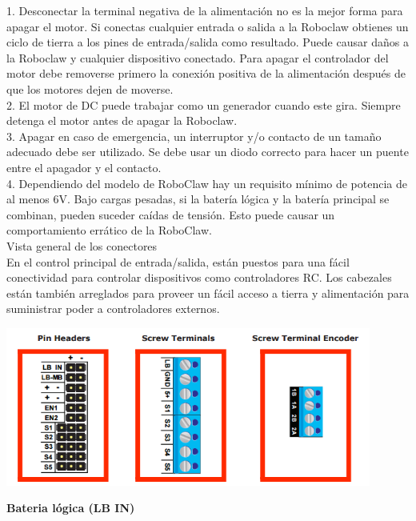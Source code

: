 \documentclass[user_manual.tex]{subfiles}
\begin{document}
1. Desconectar la terminal negativa de la alimentación no es la mejor forma para apagar el motor. Si conectas cualquier entrada o salida
a la Roboclaw obtienes un ciclo de tierra a los pines de entrada/salida como resultado. Puede causar daños a la Roboclaw y cualquier
dispositivo conectado. Para apagar el controlador del motor debe removerse primero la conexión positiva de la alimentación después de
que los motores dejen de moverse.\\

2. El motor de DC puede trabajar como un generador cuando este gira. Siempre detenga el motor
antes de apagar la Roboclaw.\\

3. Apagar en caso de emergencia, un interruptor y/o contacto de un tamaño adecuado debe ser utilizado. Se debe usar un diodo correcto para
hacer un puente entre el apagador y el contacto.\\

4. Dependiendo del modelo de RoboClaw hay un requisito mínimo de potencia de al menos 6V. Bajo cargas pesadas, si la batería lógica y
la batería principal se combinan, pueden suceder caídas de tensión. Esto puede causar un comportamiento errático de la RoboClaw.\\
Vista general de los conectores\\

En el control principal de entrada/salida, están puestos para una fácil conectividad para controlar dispositivos como controladores RC.
Los cabezales están también arreglados para proveer un fácil acceso a tierra  y alimentación para suministrar poder a controladores externos.

\begin{center}
\includegraphics[width=0.9\textwidth]{Figures/Hardware/Partes/Pines.png}
\label{fig:Hardware:Partes:Pines}
\end{center}

\textbf{Bateria lógica (LB IN)}
\end{document}
